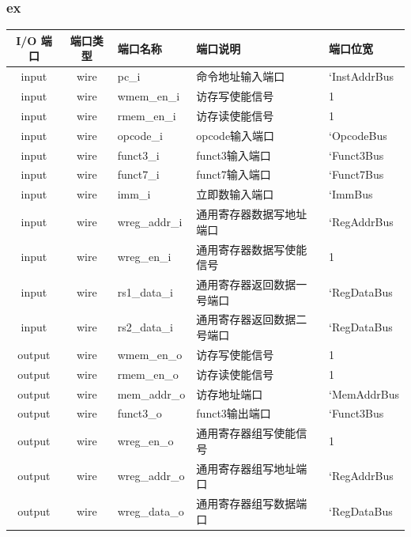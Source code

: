 \documentclass[lang=cn,11pt,a4paper,chinesefont=founder]{elegantpaper}
\begin{document}
\subsubsection{ex}
\begin{tabular}{cclll}
    \toprule
    I/O 端口 & 端口类型 & 端口名称      & 端口说明                   & 端口位宽     \\
    \midrule
    input    & wire     & pc\_i         & 命令地址输入端口           & `InstAddrBus \\
    input    & wire     & wmem\_en\_i   & 访存写使能信号             & 1            \\
    input    & wire     & rmem\_en\_i   & 访存读使能信号             & 1            \\
    input    & wire     & opcode\_i     & opcode输入端口             & `OpcodeBus   \\
    input    & wire     & funct3\_i     & funct3输入端口             & `Funct3Bus   \\
    input    & wire     & funct7\_i     & funct7输入端口             & `Funct7Bus   \\
    input    & wire     & imm\_i        & 立即数输入端口             & `ImmBus      \\

    input    & wire     & wreg\_addr\_i & 通用寄存器数据写地址端口   & `RegAddrBus  \\
    input    & wire     & wreg\_en\_i   & 通用寄存器数据写使能信号   & 1            \\
    input    & wire     & rs1\_data\_i  & 通用寄存器返回数据一号端口 & `RegDataBus  \\
    input    & wire     & rs2\_data\_i  & 通用寄存器返回数据二号端口 & `RegDataBus  \\

    output   & wire     & wmem\_en\_o   & 访存写使能信号             & 1            \\
    output   & wire     & rmem\_en\_o   & 访存读使能信号             & 1            \\
    output   & wire     & mem\_addr\_o  & 访存地址端口               & `MemAddrBus  \\
    output   & wire     & funct3\_o     & funct3输出端口             & `Funct3Bus   \\
    output   & wire     & wreg\_en\_o   & 通用寄存器组写使能信号     & 1            \\
    output   & wire     & wreg\_addr\_o & 通用寄存器组写地址端口     & `RegAddrBus  \\
    output   & wire     & wreg\_data\_o & 通用寄存器组写数据端口     & `RegDataBus  \\
    \bottomrule
\end{tabular}\\
\end{document}
